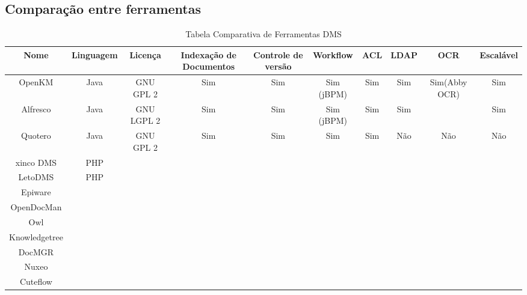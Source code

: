 \documentclass{abnt}
\begin{document}
		\begin{landscape}
			\section{Comparação entre ferramentas}
			\begin{table}[h]
			  \centering
			  \tabcolsep=0.11cm
			  \begin{tabular}{|c|c|c|c|c|c|c|c|c|c|}
			    \hline  Nome        	& Linguagem & Licença 		& Indexação de Documentos 	& Controle de versão 	& Workflow 		& ACL 	& LDAP   & OCR				& Escalável  \\
			    \hline  OpenKM      	& Java      & GNU GPL 2		& Sim                		& Sim         			& Sim (jBPM)   	& Sim 	& Sim	 & Sim(Abby OCR)	& Sim		 \\
				\hline  Alfresco     	& Java      & GNU LGPL 2	& Sim                 		& Sim         			& Sim (jBPM)   	& Sim   & Sim	 &					& Sim		 \\
				\hline  Quotero     	& Java      & GNU GPL 2		& Sim                 		& Sim         			& Sim      		& Sim   & Não	 & Não				& Não		 \\
			    \hline  xinco DMS   	& PHP       & 				&                    		&           			&          		&       & 		 &					&			 \\
				\hline  LetoDMS	    	& PHP       & 				& 	                 		&          				&          		&       & 		 &					&			 \\
				\hline  Epiware	    	& 	        & 				& 	                 		&          				&          		&       & 		 &					&			 \\
				\hline  OpenDocMan  	& 	        & 				& 	                 		&          				&          		&       & 		 &					&			 \\
				\hline  Owl 	    	& 	        & 				& 	                 		&          				&          		&       & 		 &					&			 \\
				\hline  Knowledgetree	& 	        & 				& 	                 		&          				&          		&       & 		 &					&			 \\
				\hline  DocMGR			& 	        & 				& 	                 		&          				&          		&       & 		 &					&			 \\
			    \hline  Nuxeo			& 	        & 				& 	                 		&          				&          		&       & 		 &					&			 \\
				\hline  Cuteflow		& 	        & 				& 	                 		&          				&          		&       & 		 &					&			 \\
				\hline
			  \end{tabular}
			  \caption{Tabela Comparativa de Ferramentas DMS}
			\end{table}
		\end{landscape}
\end{document}
